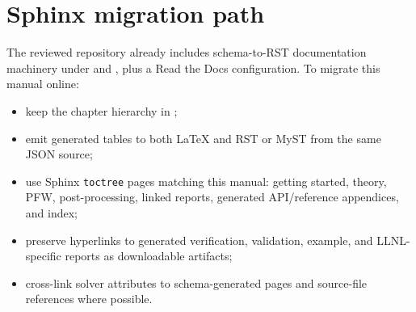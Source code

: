 \section{Sphinx migration path}
The reviewed repository already includes schema-to-RST documentation machinery under  and , plus a Read the Docs configuration.  To migrate this manual online:
\begin{itemize}[leftmargin=*]
\item keep the chapter hierarchy in ;
\item emit generated tables to both \LaTeX{} and RST or MyST from the same JSON source;
\item use Sphinx \texttt{toctree} pages matching this manual: getting started, theory, PFW, post-processing, linked reports, generated API/reference appendices, and index;
\item preserve hyperlinks to generated verification, validation, example, and LLNL-specific reports as downloadable artifacts;
\item cross-link solver attributes to schema-generated pages and source-file references where possible.
\end{itemize}
